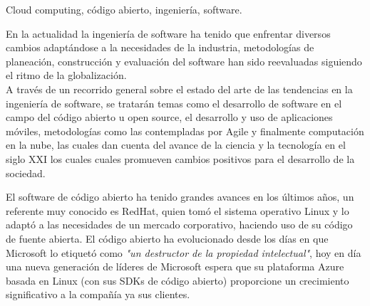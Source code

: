 \begin{multicols}{2}



Cloud computing, código abierto, ingeniería, software.

\vspace{5mm}


En la actualidad la ingeniería de software ha tenido que enfrentar diversos cambios adaptándose a la necesidades de la industria, metodologías de planeación, construcción y evaluación del software han sido reevaluadas siguiendo el ritmo de la globalización. \\

A través de un recorrido general sobre el estado del arte de las tendencias en la ingeniería de software, se tratarán temas como el desarrollo de software en el campo del código abierto u open source, el desarrollo y uso de aplicaciones móviles, metodologías como las contempladas por Agile y finalmente computación en la nube, las cuales dan cuenta del avance de la ciencia y la tecnología en el siglo XXI los cuales cuales promueven cambios positivos para el desarrollo de la sociedad.

\vspace{5mm}


El software de código abierto ha tenido grandes avances en los últimos años, un referente muy conocido es RedHat, quien tomó el sistema operativo Linux y lo adaptó a las necesidades de un mercado corporativo, haciendo uso de su código de fuente abierta. El código abierto ha evolucionado desde los días en que Microsoft lo etiquetó como \textit{"un destructor de la propiedad intelectual"}, hoy en día una nueva generación de líderes de Microsoft espera que su plataforma Azure basada en Linux (con sus SDKs de código abierto) proporcione un crecimiento significativo a la compañía ya sus clientes. \\


\end{multicols}
